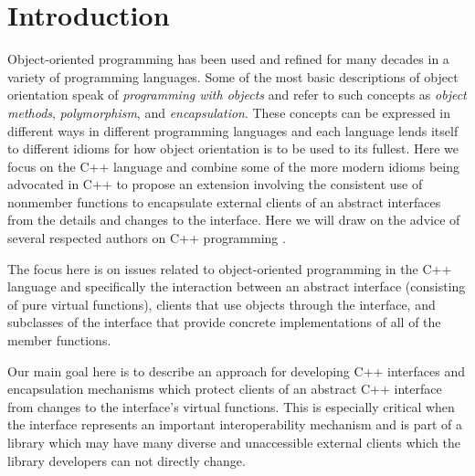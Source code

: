 \documentclass[pdf,ps2pdf,11pt]{SANDreport}
\begin{document}

%
\SANDmain %

%
\section{Introduction}
%

Object-oriented programming has been used and refined for many decades in a
variety of programming languages.  Some of the most basic descriptions of
object orientation speak of {}\textit{programming with objects} and refer to
such concepts as {}\textit{object methods}, {}\textit{polymorphism}, and
{}\textit{encapsulation}.  These concepts can be expressed in different ways
in different programming languages and each language lends itself to different
idioms for how object orientation is to be used to its fullest.  Here we focus
on the C++ language and combine some of the more modern idioms being advocated
in C++ to propose an extension involving the consistent use of nonmember
functions to encapsulate external clients of an abstract interfaces from the
details and changes to the interface.  Here we will draw on the advice of
several respected authors on C++ programming
{}\cite{C++CodingStandards05,EffectiveC++3rd??}.

The focus here is on issues related to object-oriented programming in the C++
language and specifically the interaction between an abstract interface
(consisting of pure virtual functions), clients that use objects through the
interface, and subclasses of the interface that provide concrete
implementations of all of the member functions.

Our main goal here is to describe an approach for developing C++ interfaces
and encapsulation mechanisms which protect clients of an abstract C++
interface from changes to the interface's virtual functions.  This is
especially critical when the interface represents an important
interoperability mechanism and is part of a library which may have many
diverse and unaccessible external clients which the library developers can not
directly change.
\end{document}
